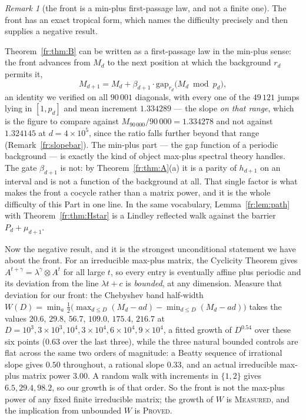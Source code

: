 \documentclass[11pt]{article}
\theoremstyle{definition}
\theoremstyle{remark}
\newtheorem{remark}[theorem]{Remark}
\newcommand{\PROVED}{\textsc{Proved}}
\newcommand{\MEASURED}{\textsc{Measured}}
\begin{document}
\begin{remark}[the front is a min-plus first-passage law, and not a finite one]\label{fr:tropical}
The front has an exact tropical form, which names the difficulty precisely and then supplies a
negative result.

Theorem~\ref{fr:thm:B} can be written as a first-passage law in the min-plus sense: the front advances
from $M_d$ to the next position at which the background $r_d$ permits it,
\[
M_{d+1}=M_d+\beta_{d+1}\cdot\mathrm{gap}_{r_d}\bigl(M_d \bmod p_d\bigr),
\]
an identity we verified on all $90\,001$ diagonals, with every one of the $49\,121$ jumps lying in
$[1,p_d]$ and mean increment $1.334289$ --- the slope \emph{on that range}, which is the figure to
compare against $M_{90\,000}/90\,000=1.334278$ and not against $1.324145$ at
$d=4\times10^{5}$, since the ratio falls further beyond that range (Remark~\ref{fr:slopebar}). The min-plus part --- the gap
function of a periodic background --- is exactly the kind of object max-plus spectral theory handles.
The gate $\beta_{d+1}$ is not: by Theorem~\ref{fr:thm:A}(a) it is a parity of $h_{d+1}$ on an interval
and is not a function of the background at all. That single factor is what makes the front a cocycle
rather than a matrix power, and it is the whole difficulty of this Part in one line. In the same
vocabulary, Lemma~\ref{fr:lem:path} with Theorem~\ref{fr:thm:Hstar} is a Lindley reflected walk against
the barrier $P_d+\mu_{d+1}$.

Now the negative result, and it is the strongest unconditional statement we have about the front. For an
irreducible max-plus matrix, the Cyclicity Theorem \cite[Thms.~3.109, 3.112]{BCOQ} gives
$A^{t+\gamma}=\lambda^{\gamma}\otimes A^{t}$ for all large $t$, so every entry is eventually affine plus
periodic and its deviation from the line $\lambda t+c$ is \emph{bounded}, at any dimension. Measure that
deviation for our front: the Chebyshev band half-width
$W(D)=\min_a\tfrac12\bigl(\max_{d\le D}(M_d-ad)-\min_{d\le D}(M_d-ad)\bigr)$ takes the values
$20.6,\,29.8,\,56.7,\,109.0,\,175.4,\,216.7$ at $D=10^{3},3\times10^{3},10^{4},3\times10^{4},
6\times10^{4},9\times10^{4}$, a fitted growth of $D^{0.54}$ over these six points ($0.63$ over the last three), while the three natural bounded controls
are flat across the same two orders of magnitude: a Beatty sequence of irrational slope gives $0.50$
throughout, a rational slope $0.33$, and an actual irreducible max-plus matrix power $3.00$. A random
walk with increments in $\{1,2\}$ gives $6.5,29.4,98.2$, so our growth is of that order. So the front is
not the max-plus power of any fixed finite irreducible matrix; the growth of $W$ is \MEASURED, and the
implication from unbounded $W$ is \PROVED.


\end{remark}
\end{document}
